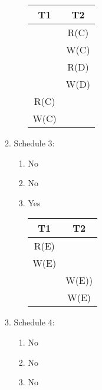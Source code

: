 \documentclass{report}
\begin{document}
\begin{enumerate}
\begin{enumerate}
\begin{enumerate}
\begin{tabular}{c c}
				T1 & T2 \\
				\hline 
				& R(C) \\
				& W(C) \\
				& R(D) \\ 
				& W(D)\\ 
				R(C) & \\ 
				W(C) & \\
				\end{tabular}
			\end{enumerate}
			\item Schedule 3:
			\begin{enumerate}
				\item No
				\item No
				\item Yes \\
				\begin{tabular}{c c} \\
				T1 & T2 \\
				\hline 
				R(E)& \\
				W(E)& \\ 
				& W(E)) \\
				& W(E)\\
				\end{tabular}
			\end{enumerate}
			\item Schedule 4:
			\begin{enumerate}
				\item No
				\item No
				\item No
			\end{enumerate}
		\end{enumerate}
	\end{enumerate}
\end{document}

